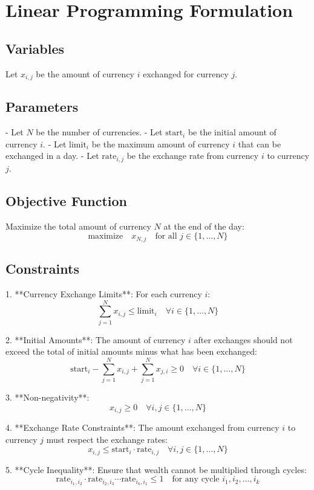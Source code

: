 \documentclass{article}
\begin{document}
\section*{Linear Programming Formulation}

\subsection*{Variables}
Let \( x_{i,j} \) be the amount of currency \( i \) exchanged for currency \( j \).

\subsection*{Parameters}
- Let \( N \) be the number of currencies.
- Let \( \text{start}_i \) be the initial amount of currency \( i \).
- Let \( \text{limit}_i \) be the maximum amount of currency \( i \) that can be exchanged in a day.
- Let \( \text{rate}_{i,j} \) be the exchange rate from currency \( i \) to currency \( j \).

\subsection*{Objective Function}
Maximize the total amount of currency \( N \) at the end of the day:
\[
\text{maximize} \quad x_{N,j} \quad \text{for all } j \in \{1, \ldots, N\}
\]

\subsection*{Constraints}

1. **Currency Exchange Limits**:
   For each currency \( i \):
   \[
   \sum_{j=1}^{N} x_{i,j} \leq \text{limit}_i \quad \forall i \in \{1, \ldots, N\}
   \]

2. **Initial Amounts**:
   The amount of currency \( i \) after exchanges should not exceed the total of initial amounts minus what has been exchanged:
   \[
   \text{start}_i - \sum_{j=1}^{N} x_{i,j} + \sum_{j=1}^{N} x_{j,i} \geq 0 \quad \forall i \in \{1, \ldots, N\}
   \]

3. **Non-negativity**:
   \[
   x_{i,j} \geq 0 \quad \forall i,j \in \{1, \ldots, N\}
   \]

4. **Exchange Rate Constraints**:
   The amount exchanged from currency \( i \) to currency \( j \) must respect the exchange rates:
   \[
   x_{i,j} \leq \text{start}_i \cdot \text{rate}_{i,j} \quad \forall i,j \in \{1, \ldots, N\}
   \]

5. **Cycle Inequality**:
   Ensure that wealth cannot be multiplied through cycles:
   \[
   \text{rate}_{i_1,i_2} \cdot \text{rate}_{i_2,i_3} \cdots \text{rate}_{i_k,i_1} \leq 1 \quad \text{for any cycle } i_1, i_2, \ldots, i_k
   \]
\end{document}
